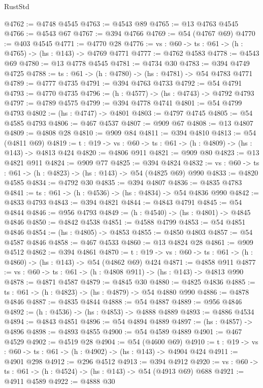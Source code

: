 \begin{lexlean}{RustStd}
\begin{coremodule}
{\begin{coremodule}
{{{{{{{{@4762 := @4748 @4545
@4763 := @4543 @89
@4765 := @13 @4763 @4545
@4766 := @4543 @67
@4767 := @394 @4766
@4769 := @54 (@4767 @69)
@4770 := @403 @4545
@4771 := @4770 @28
@4776 := {vs : @60} -> {ts : @61} -> (h : @4765) -> (hs : @143) -> @4769 @4771
@4777 := @4762 @4583
@4778 := @4543 @69
@4780 := @13 @4778 @4545
@4781 := @4734 @30
@4783 := @394 @4749 @4725
@4788 := {ts : @61} -> (h : @4780) -> (hs : @4781) -> @54 @4783 @4771
@4789 := @4777 @4735
@4791 := @394 @4763 @4733
@4792 := @54 @4791
@4793 := @4770 @4735
@4796 := (h : @4577) -> (hs : @4743) -> @4792 @4793
@4797 := @4789 @4575
@4799 := @394 @4778 @4741
@4801 := @54 @4799 @4793
@4802 := (hs : @4747) -> @4801
@4803 := @4797 @4745
@4805 := @54 @4585 @4793
@4806 := @467 @4537
@4807 := @909 @67
@4808 := @13 @4807
@4809 := @4808 @28
@4810 := @909 @84
@4811 := @394 @4810
@4813 := @54 (@4811 @69)
@4819 := {t : @19} -> {vs : @60} -> {ts : @61} -> (h : @4809) -> (hs : @143) -> @4813 @424
@4820 := @4806 @911
@4821 := @909 @80
@4823 := @13 @4821 @911
@4824 := @909 @77
@4825 := @394 @4824
@4832 := {vs : @60} -> {ts : @61} -> (h : @4823) -> (hs : @143) -> @54 (@4825 @69) @990
@4833 := @4820 @4585
@4834 := @4792 @30
@4835 := @394 @4807
@4836 := @4835 @4783
@4841 := {ts : @61} -> (h : @4536) -> (hs : @4834) -> @54 @4836 @990
@4842 := @4833 @4793
@4843 := @394 @4821
@4844 := @4843 @4791
@4845 := @54 @4844
@4846 := @956 @4793
@4849 := (h : @4540) -> (hs : @4801) -> @4845 @4846
@4850 := @4842 @4538
@4851 := @4588 @4799
@4853 := @54 @4851 @4846
@4854 := (hs : @4805) -> @4853
@4855 := @4850 @4803
@4857 := @54 @4587 @4846
@4858 := @467 @4533
@4860 := @13 @4824 @28
@4861 := @909 @4512
@4862 := @394 @4861
@4870 := {t : @19} -> {vs : @60} -> {ts : @61} -> (h : @4860) -> (hs : @143) -> @54 (@4862 @69) @424
@4871 := @4858 @911
@4877 := {vs : @60} -> {ts : @61} -> (h : @4808 @911) -> (hs : @143) -> @4813 @990
@4878 := @4871 @4587
@4879 := @4845 @30
@4880 := @4825 @4836
@4885 := {ts : @61} -> (h : @4823) -> (hs : @4879) -> @54 @4880 @990
@4886 := @4878 @4846
@4887 := @4835 @4844
@4888 := @54 @4887
@4889 := @956 @4846
@4892 := (h : @4536) -> (hs : @4853) -> @4888 @4889
@4893 := @4886 @4534
@4894 := @4843 @4851
@4896 := @54 @4894 @4889
@4897 := (hs : @4857) -> @4896
@4898 := @4893 @4855
@4900 := @54 @4589 @4889
@4901 := @467 @4529
@4902 := @4519 @28
@4904 := @54 (@4600 @69)
@4910 := {t : @19} -> {vs : @60} -> {ts : @61} -> (h : @4902) -> (hs : @143) -> @4904 @424
@4911 := @4901 @298
@4912 := @296 @4512
@4913 := @394 @4912
@4920 := {vs : @60} -> {ts : @61} -> (h : @4524) -> (hs : @143) -> @54 (@4913 @69) @688
@4921 := @4911 @4589
@4922 := @4888 @30
}}}}}}}}
\end{coremodule}}
\end{coremodule}
\end{lexlean}
